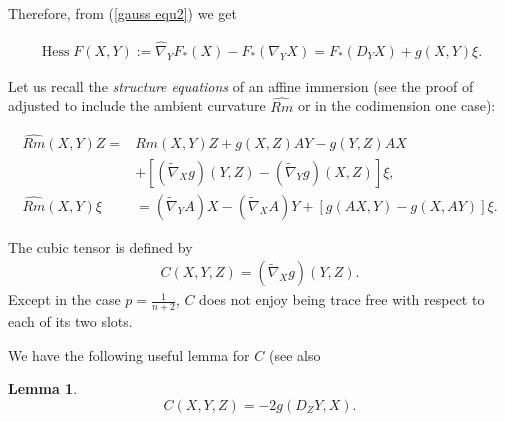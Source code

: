 \documentclass{amsart}
\newtheorem{lemma}[theorem]{Lemma}
\theoremstyle{definition}
\theoremstyle{remark}
\numberwithin{equation}{section}
\begin{document}
Therefore, from (\ref{gauss equ2}) we get

\begin{align}\label{gauss equ3}
\operatorname{Hess}F(X,Y):=\hat{\nabla}_YF_{\ast}(X)-F_{\ast}(\nabla_YX)=F_{\ast}(D_YX)+g(X,Y)\xi.
\end{align}

Let us recall the \emph{structure equations} of an affine immersion (see the proof of \cite[Section II, Theorem 2.1]{MR1311248} adjusted to include the ambient curvature $\widehat{Rm}$ or \cite[p. 197 equations (N1.6)--(N1.9)]{MR1311248} in the codimension one case):

\begin{align}
\label{eq:structure1}
\widehat{Rm} (X, Y) Z =& Rm(X, Y) Z + g(X, Z) A Y - g(Y, Z)A X \\
&+ \left[(\tilde{\nabla}_X g) (Y, Z) - (\tilde{\nabla}_Y g)( X, Z)\right] \xi \nonumber,\\
\label{eq:sturcture2}
\widehat{Rm} (X, Y) \xi &= (\tilde{\nabla}_Y A) X - (\tilde{\nabla}_X A) Y + \left[g(AX, Y) - g(X, AY)\right]\xi.
\end{align}

The cubic tensor is defined by
\begin{align}
C(X,Y,Z) = (\tilde{\nabla}_X g) (Y,Z).
\end{align}
Except in the case $ p =\frac{1}{n+2}$, $ C$ does not enjoy being trace free with respect to each of its two slots.

We have the following useful lemma for $C$ (see also \cite[Section II, Proposition 4.1]{MR1311248}

\begin{lemma}
\[
C(X, Y, Z) =  -2g(D_Z Y, X).
\]
\end{lemma}
\end{document}
